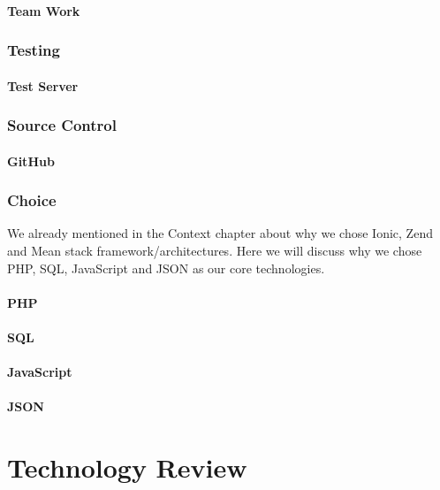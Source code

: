 \subsubsection{Team Work}

\subsection{Testing}
\subsubsection{Test Server}

\subsection{Source Control}
\subsubsection{GitHub}

\subsection{Choice}
We already mentioned in the Context chapter about why we chose Ionic, Zend and Mean stack framework/architectures.
Here we will discuss why we chose PHP, SQL, JavaScript and JSON as our core technologies.
\subsubsection{PHP}

\subsubsection{SQL}

\subsubsection{JavaScript}

\subsubsection{JSON}


\chapter{Technology Review} %

